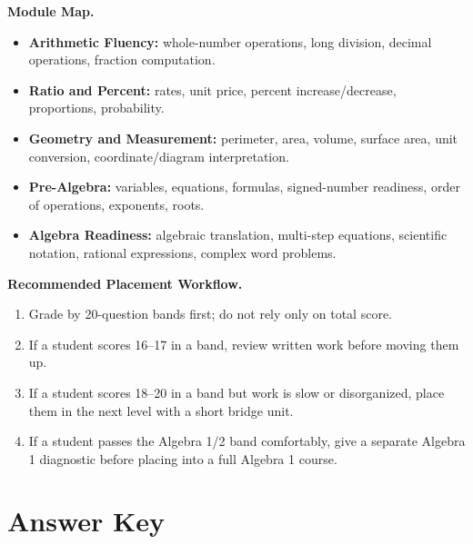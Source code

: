 \documentclass[11pt]{article}
\begin{document}
\vspace{0.5em}
\begin{guidebox}
\textbf{Module Map.}
\begin{itemize}[leftmargin=1.2em,itemsep=0.22em]
\item \textbf{Arithmetic Fluency:} whole-number operations, long division, decimal operations, fraction computation.
\item \textbf{Ratio and Percent:} rates, unit price, percent increase/decrease, proportions, probability.
\item \textbf{Geometry and Measurement:} perimeter, area, volume, surface area, unit conversion, coordinate/diagram interpretation.
\item \textbf{Pre-Algebra:} variables, equations, formulas, signed-number readiness, order of operations, exponents, roots.
\item \textbf{Algebra Readiness:} algebraic translation, multi-step equations, scientific notation, rational expressions, complex word problems.
\end{itemize}
\end{guidebox}

\begin{guidebox}
\textbf{Recommended Placement Workflow.}
\begin{enumerate}[leftmargin=1.4em,itemsep=0.25em]
\item Grade by 20-question bands first; do not rely only on total score.
\item If a student scores 16--17 in a band, review written work before moving them up.
\item If a student scores 18--20 in a band but work is slow or disorganized, place them in the next level with a short bridge unit.
\item If a student passes the Algebra 1/2 band comfortably, give a separate Algebra 1 diagnostic before placing into a full Algebra 1 course.
\end{enumerate}
\end{guidebox}

\newpage
\section*{Answer Key}
\end{document}

